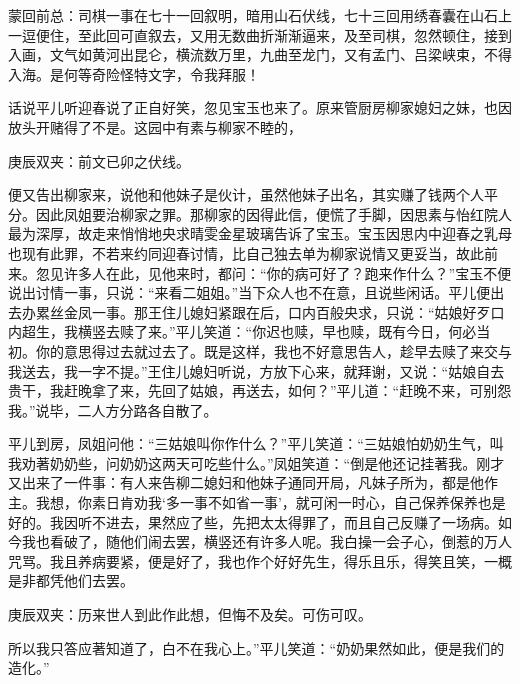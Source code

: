 \begin{parag}
    \begin{note}蒙回前总：司棋一事在七十一回叙明，暗用山石伏线，七十三回用绣春囊在山石上一逗便住，至此回可直叙去，又用无数曲折渐渐逼来，及至司棋，忽然顿住，接到入画，文气如黄河出昆仑，横流数万里，九曲至龙门，又有孟门、吕梁峡束，不得入海。是何等奇险怪特文字，令我拜服！\end{note}
\end{parag}


\begin{parag}
    话说平儿听迎春说了正自好笑，忽见宝玉也来了。原来管厨房柳家媳妇之妹，也因放头开赌得了不是。这园中有素与柳家不睦的，\begin{note}庚辰双夹：前文已卯之伏线。\end{note}便又告出柳家来，说他和他妹子是伙计，虽然他妹子出名，其实赚了钱两个人平分。因此凤姐要治柳家之罪。那柳家的因得此信，便慌了手脚，因思素与怡红院人最为深厚，故走来悄悄地央求晴雯金星玻璃告诉了宝玉。宝玉因思内中迎春之乳母也现有此罪，不若来约同迎春讨情，比自己独去单为柳家说情又更妥当，故此前来。忽见许多人在此，见他来时，都问：“你的病可好了？跑来作什么？”宝玉不便说出讨情一事，只说：“来看二姐姐。”当下众人也不在意，且说些闲话。平儿便出去办累丝金凤一事。那王住儿媳妇紧跟在后，口内百般央求，只说：“姑娘好歹口内超生，我横竖去赎了来。”平儿笑道：“你迟也赎，早也赎，既有今日，何必当初。你的意思得过去就过去了。既是这样，我也不好意思告人，趁早去赎了来交与我送去，我一字不提。”王住儿媳妇听说，方放下心来，就拜谢，又说：“姑娘自去贵干，我赶晚拿了来，先回了姑娘，再送去，如何？”平儿道：“赶晚不来，可别怨我。”说毕，二人方分路各自散了。
\end{parag}


\begin{parag}
    平儿到房，凤姐问他：“三姑娘叫你作什么？”平儿笑道：“三姑娘怕奶奶生气，叫我劝著奶奶些，问奶奶这两天可吃些什么。”凤姐笑道：“倒是他还记挂著我。刚才又出来了一件事：有人来告柳二媳妇和他妹子通同开局，凡妹子所为，都是他作主。我想，你素日肯劝我‘多一事不如省一事’，就可闲一时心，自己保养保养也是好的。我因听不进去，果然应了些，先把太太得罪了，而且自己反赚了一场病。如今我也看破了，随他们闹去罢，横竖还有许多人呢。我白操一会子心，倒惹的万人咒骂。我且养病要紧，便是好了，我也作个好好先生，得乐且乐，得笑且笑，一概是非都凭他们去罢。\begin{note}庚辰双夹：历来世人到此作此想，但悔不及矣。可伤可叹。\end{note}所以我只答应著知道了，白不在我心上。”平儿笑道：“奶奶果然如此，便是我们的造化。”
\end{parag}


